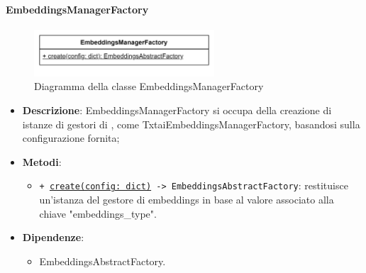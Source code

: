 \paragraph{EmbeddingsManagerFactory} \label{EmbeddingsManagerFactory}
\begin{figure}[H]
    \centering
    \includegraphics[width=0.6\textwidth]{assets/Backend/embeddings_manager_factory.png}
    \caption{Diagramma della classe EmbeddingsManagerFactory}
  \end{figure}
\begin{itemize}
    \item \textbf{Descrizione}: EmbeddingsManagerFactory si occupa della creazione di istanze di gestori di , come TxtaiEmbeddingsManagerFactory, basandosi sulla configurazione fornita;
    \item \textbf{Metodi}:
    \begin{itemize}
        \item \texttt{+ \underline{create(config: dict)} -> EmbeddingsAbstractFactory}: restituisce un'istanza del gestore di embeddings in base al valore associato alla chiave "embeddings_type".
    \end{itemize}
    \item \textbf{Dipendenze}:
    \begin{itemize}
        \item EmbeddingsAbstractFactory.
    \end{itemize}
\end{itemize} 

